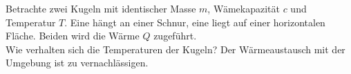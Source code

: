 \begin{Exercise}[label = Zwei Kugeln, title = Zwei Kugeln, difficulty = 4, origin = IPhO 1967]
Betrachte zwei Kugeln mit identischer Masse $m$, Wämekapazität $c$ und Temperatur $T$. Eine hängt an einer Schnur, eine liegt auf einer horizontalen Fläche. Beiden wird die Wärme $Q$ zugeführt. \\
Wie verhalten sich die Temperaturen der Kugeln? Der Wärmeaustausch mit der Umgebung ist zu vernachlässigen.
\end{Exercise}